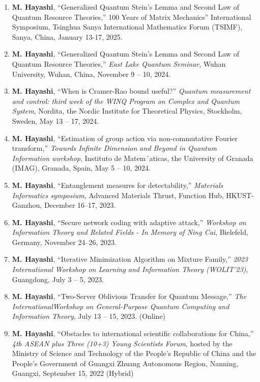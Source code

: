 \documentclass[a4paper,12pt,oneside]{article}
\begin{document}
\begin{enumerate}
\item
\textbf{M. Hayashi}, 
``Generalized Quantum Stein's Lemma and Second Law of Quantum Resource Theories,'' 100 Years of Matrix Mechanics” International Symposium, Tsinghua Sanya International Mathematics Forum (TSIMF), Sanya, China, January 13-17, 2025.

\item
\textbf{M. Hayashi}, 
``Generalized Quantum Stein’s Lemma and Second Law of Quantum Resource Theories,''
{\em East Lake Quantum Seminar}, 
Wuhan University, Wuhan, China, 
November 9 -- 10, 2024.

\item 
\textbf{M. Hayashi}, 
``When is Cramer-Rao bound useful?'' 
{\em Quantum measurement and control: third week of the WINQ Program on Complex and Quantum System}, 
Nordita, the Nordic Institute for Theoretical Physics, Stockholm, Sweden, May 13 -- 17, 2024.

\item 
\textbf{M. Hayashi}, 
``Estimation of group action via non-commutative Fourier transform,'' 
{\em Towards Infinite Dimension and Beyond in Quantum Information workshop}, 
Instituto de Matem´aticas, the University of Granada (IMAG), Granada, Spain, May 5 -- 10, 2024.

\item 
\textbf{M. Hayashi}, 
``Entanglement measures for detectability,'' 
{\em Materials Informatics symposium}, 
Advanced Materials Thrust, Function Hub, HKUST-Ganzhou, December 16–17, 2023.

\item 
\textbf{M. Hayashi}, 
``Secure network coding with adaptive attack,'' 
{\em Workshop on Information Theory and Related Fields - In Memory of Ning Cai}, 
Bielefeld, Germany, November 24–26, 2023.

\item 
\textbf{M. Hayashi}, 
``Iterative Minimization Algorithm on Mixture Family,'' 
{\em 2023 International Workshop on Learning and Information Theory (WOLIT’23)}, 
Guangdong, July 3 – 5, 2023.

\item 
\textbf{M. Hayashi}, 
``Two-Server Oblivious Transfer for Quantum Message,'' 
{\em The InternationalWorkshop on General-Purpose Quantum Computing and Information Theory}, 
July 13 – 15, 2023. (Online)

\item 
\textbf{M. Hayashi}, 
``Obstacles to international scientific collaborations for China,'' 
{\em  4th ASEAN plus Three (10+3) Young Scientists Forum}, 
hosted by the Ministry of Science and Technology of the People’s Republic of China and 
the People’s Government of Guangxi Zhuang Autonomous Region, 
Nanning, Guangxi, September 15, 2022 (Hybrid)


\end{enumerate}
\end{document}
